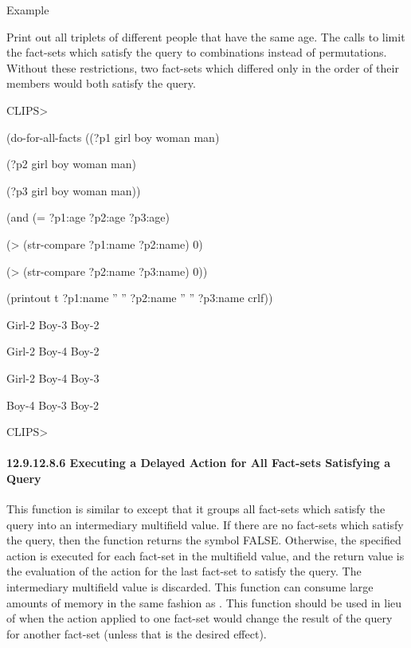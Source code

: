 \documentclass[letterpaper,10pt,english]{sphinxmanual}
\begin{document}
Example

Print out all triplets of different people that have the same age. The
calls to  limit the fact-sets which satisfy the query to
combinations instead of permutations. Without these restrictions, two
fact-sets which differed only in the order of their members would both
satisfy the query.

CLIPS\textgreater{}

(do-for-all-facts ((?p1 girl boy woman man)

(?p2 girl boy woman man)

(?p3 girl boy woman man))

(and (= ?p1:age ?p2:age ?p3:age)

(\textgreater{} (str-compare ?p1:name ?p2:name) 0)

(\textgreater{} (str-compare ?p2:name ?p3:name) 0))

(printout t ?p1:name ” ” ?p2:name ” ” ?p3:name crlf))

Girl-2 Boy-3 Boy-2

Girl-2 Boy-4 Boy-2

Girl-2 Boy-4 Boy-3

Boy-4 Boy-3 Boy-2

CLIPS\textgreater{}


\paragraph{12.9.12.8.6 Executing a Delayed Action for All Fact-sets Satisfying a Query}
\label{\detokenize{actions:executing-a-delayed-action-for-all-fact-sets-satisfying-a-query}}
This function is similar to  except that it groups
all fact-sets which satisfy the query into an intermediary multifield
value. If there are no fact-sets which satisfy the query, then the
function returns the symbol FALSE. Otherwise, the specified action is
executed for each fact-set in the multifield value, and the return value
is the evaluation of the action for the last fact-set to satisfy the
query. The intermediary multifield value is discarded. This function can
consume large amounts of memory in the same fashion as
. This function should be used in lieu of
 when the action applied to one fact-set would
change the result of the query for another fact-set (unless that is the
desired effect).

\end{document}
